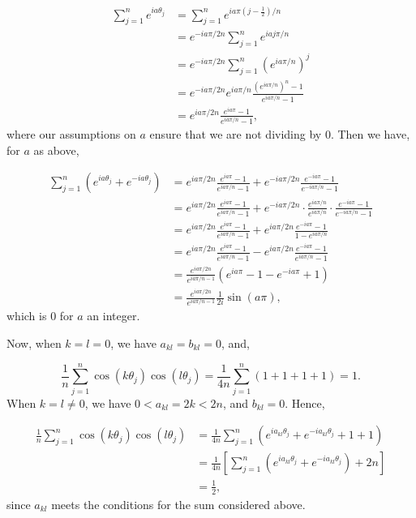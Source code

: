 \documentclass[12pt,a4paper]{article}
\begin{document}
\begin{align*}
	\sum_{j=1}^n e^{ia\theta_j} &=\sum_{j=1}^n e^{ia\pi(j-\frac{1}{2})/n} \\
	&=e^{-ia\pi/2n}\sum_{j=1}^n e^{iaj\pi/n} \\
	&=e^{-ia\pi/2n}\sum_{j=1}^n (e^{ia\pi/n})^j \\
	&=e^{-ia\pi/2n} e^{ia\pi/n}\frac{(e^{ia\pi /n})^n - 1}{e^{ia\pi/n} - 1} \\
	&= e^{ia\pi/2n} \frac{e^{ia\pi} - 1 }{e^{ia\pi / n} - 1},
\end{align*}
where our assumptions on $a$ ensure that we are not dividing by $0$. Then we have, for $a$ as above,


\begin{align*}
	\sum_{j=1}^n \left(e^{ia\theta_j} + e^{-ia\theta_j}\right) &= e^{ia\pi/2n} \frac{e^{ia\pi} - 1 }{e^{ia\pi / n} - 1} + e^{-ia\pi/2n} \frac{e^{-ia\pi} - 1 }{e^{-ia\pi / n} - 1} \\
	&= e^{ia\pi/2n} \frac{e^{ia\pi} - 1 }{e^{ia\pi / n} - 1} + e^{-ia\pi/2n} \cdot\frac{e^{ia\pi/n}}{e^{ia\pi/n}}\cdot \frac{e^{-ia\pi} - 1 }{e^{-ia\pi / n} - 1} \\
	&= e^{ia\pi/2n} \frac{e^{ia\pi} - 1 }{e^{ia\pi / n} - 1} + e^{ia\pi/2n}\frac{e^{-ia\pi} - 1}{1 - e^{ia\pi/n}} \\
	&=e^{ia\pi/2n} \frac{e^{ia\pi} - 1 }{e^{ia\pi / n} - 1} - e^{ia\pi/2n}\frac{e^{-ia\pi} - 1}{e^{ia\pi/n} - 1} \\
	&= \frac{e^{ia\pi/2n}}{e^{ia\pi/n-1}}\left(e^{ia\pi} - 1 - e^{-ia\pi} + 1 \right) \\
	&= \frac{e^{ia\pi/2n}}{e^{ia\pi/n-1}}\frac{1}{2i}\sin(a\pi),
\end{align*}
which is $0$ for $a$ an integer.

Now, when $k = l = 0$, we have $a_{kl} = b_{kl} = 0$, and,

\[
\frac{1}{n}\sum_{j=1}^n \cos(k\theta_j)\cos(l\theta_j) = \frac{1}{4n}\sum_{j=1}^n (1 + 1 + 1 + 1) = 1.
\]
When $k = l \neq 0$, we have $0 < a_{kl} = 2k < 2n$, and $b_{kl} = 0$. Hence,


\begin{align*}
	\frac{1}{n}\sum_{j=1}^n \cos(k\theta_j)\cos(l\theta_j) &= \frac{1}{4n}\sum_{j=1}^n (e^{ia_{kl}\theta_j} + e^{-ia_{kl}\theta_j} + 1 + 1) \\
	&= \frac{1}{4n}\left[ \sum_{j=1}^n\left( e^{ia_{kl}\theta_j} + e^{-ia_{kl}\theta_j}\right) +2n\right] \\
	&= \frac{1}{2},
\end{align*}
since $a_{kl}$ meets the conditions for the sum considered above.
\end{document}
